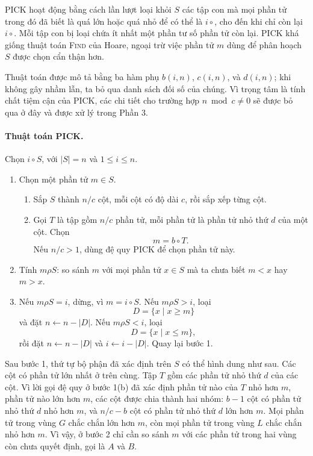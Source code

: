 \documentclass[11pt]{article}
\newcommand{\PICK}{\textsc{PICK}}
\begin{document}
\PICK{} hoạt động bằng cách lần lượt loại khỏi \(S\) các tập con mà mọi phần tử
trong đó đã biết là quá lớn hoặc quá nhỏ để có thể là \(i\circ\), cho đến khi
chỉ còn lại \(i\circ\). Mỗi tập con bị loại chứa ít nhất một phần tư số phần
tử còn lại. \PICK{} khá giống thuật toán \textsc{Find} của Hoare, ngoại trừ
việc phần tử \(m\) dùng để phân hoạch \(S\) được chọn cẩn thận hơn.

Thuật toán được mô tả bằng ba hàm phụ \(b(i,n)\), \(c(i,n)\), và \(d(i,n)\);
khi không gây nhầm lẫn, ta bỏ qua danh sách đối số của chúng. Vì trọng tâm là
tính chất tiệm cận của \PICK, các chi tiết cho trường hợp \(n\bmod c\ne 0\) sẽ
được bỏ qua ở đây và được xử lý trong Phần 3.

\paragraph{Thuật toán \PICK.}
Chọn \(i\circ S\), với \(|S|=n\) và \(1\le i\le n\).

\begin{enumerate}
  \item Chọn một phần tử \(m\in S\).
  \begin{enumerate}
    \item Sắp \(S\) thành \(n/c\) cột, mỗi cột có độ dài \(c\), rồi sắp xếp
    từng cột.
    \item Gọi \(T\) là tập gồm \(n/c\) phần tử, mỗi phần tử là phần tử nhỏ
    thứ \(d\) của một cột. Chọn
    \[
      m=b\circ T.
    \]
    Nếu \(n/c>1\), dùng đệ quy \PICK{} để chọn phần tử này.
  \end{enumerate}
  \item Tính \(m\rho S\): so sánh \(m\) với mọi phần tử \(x\in S\) mà ta chưa
  biết \(m<x\) hay \(m>x\).
  \item Nếu \(m\rho S=i\), dừng, vì \(m=i\circ S\). Nếu \(m\rho S>i\), loại
  \[
    D=\{x\mid x\ge m\}
  \]
  và đặt \(n\gets n-|D|\). Nếu \(m\rho S<i\), loại
  \[
    D=\{x\mid x\le m\},
  \]
  rồi đặt \(n\gets n-|D|\) và \(i\gets i-|D|\). Quay lại bước 1.
\end{enumerate}

Sau bước 1, thứ tự bộ phận đã xác định trên \(S\) có thể hình dung như sau.
Các cột có phần tử lớn nhất ở trên cùng. Tập \(T\) gồm các phần tử nhỏ thứ
\(d\) của các cột. Vì lời gọi đệ quy ở bước 1(b) đã xác định phần tử nào của
\(T\) nhỏ hơn \(m\), phần tử nào lớn hơn \(m\), các cột được chia thành hai
nhóm: \(b-1\) cột có phần tử nhỏ thứ \(d\) nhỏ hơn \(m\), và \(n/c-b\) cột có
phần tử nhỏ thứ \(d\) lớn hơn \(m\). Mọi phần tử trong vùng \(G\) chắc chắn lớn
hơn \(m\), còn mọi phần tử trong vùng \(L\) chắc chắn nhỏ hơn \(m\). Vì vậy, ở
bước 2 chỉ cần so sánh \(m\) với các phần tử trong hai vùng còn chưa quyết
định, gọi là \(A\) và \(B\).
\end{document}
